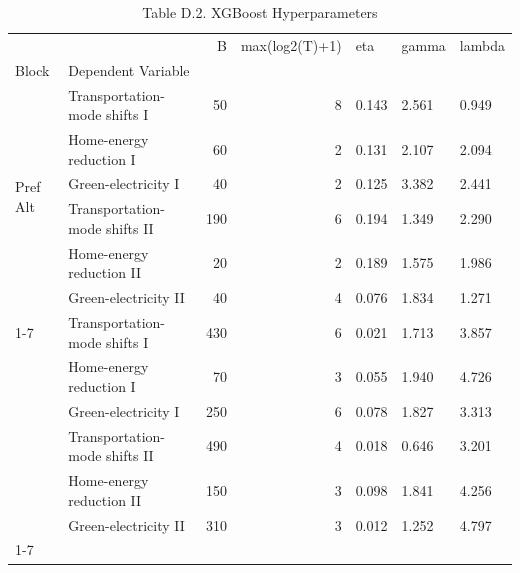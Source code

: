 \begin{table}
\caption{Table D.2. XGBoost Hyperparameters}
\begin{tabular}{llrrlll}
\toprule
 &  & B & max(log2(T)+1) & eta & gamma & lambda \\
Block & Dependent Variable &  &  &  &  &  \\
\midrule
\multirow[t]{6}{*}{Pref Alt} & Transportation-mode shifts I & 50 & 8 & 0.143 & 2.561 & 0.949 \\
 & Home-energy reduction I & 60 & 2 & 0.131 & 2.107 & 2.094 \\
 & Green-electricity I & 40 & 2 & 0.125 & 3.382 & 2.441 \\
 & Transportation-mode shifts II & 190 & 6 & 0.194 & 1.349 & 2.290 \\
 & Home-energy reduction II & 20 & 2 & 0.189 & 1.575 & 1.986 \\
 & Green-electricity II & 40 & 4 & 0.076 & 1.834 & 1.271 \\
\cline{1-7}
\multirow[t]{6}{*}{WTA} & Transportation-mode shifts I & 430 & 6 & 0.021 & 1.713 & 3.857 \\
 & Home-energy reduction I & 70 & 3 & 0.055 & 1.940 & 4.726 \\
 & Green-electricity I & 250 & 6 & 0.078 & 1.827 & 3.313 \\
 & Transportation-mode shifts II & 490 & 4 & 0.018 & 0.646 & 3.201 \\
 & Home-energy reduction II & 150 & 3 & 0.098 & 1.841 & 4.256 \\
 & Green-electricity II & 310 & 3 & 0.012 & 1.252 & 4.797 \\
\cline{1-7}
\bottomrule
\end{tabular}
\end{table}
